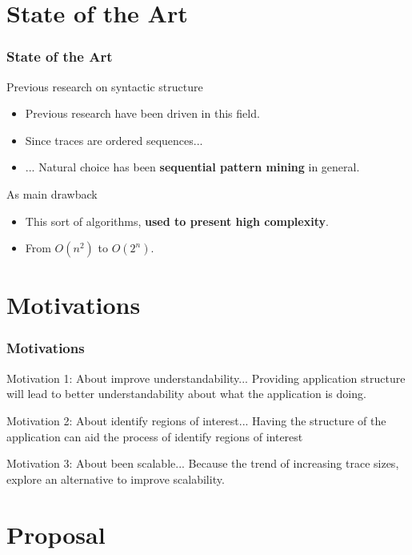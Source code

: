 \documentclass{beamer}
\begin{document}
\section{State of the Art}

\begin{frame}
\frametitle{State of the Art}
	Previous research on syntactic structure\\
	\begin{itemize}
		\item Previous research have been driven in this field.
		\item Since traces are ordered sequences...
		\item ... Natural choice has been \textbf{sequential pattern mining} in general.
	\end{itemize}
	As main drawback\\
	\begin{itemize}
		\item This sort of algorithms, \textbf{used to present high complexity}.
		\item From $O(n^{2})$ to $O(2^{n})$.
	\end{itemize}
\end{frame}

\section{Motivations}
\begin{frame}
\frametitle{Motivations}
\begin{block}{Motivation 1: About improve understandability...}
	Providing application structure will lead to better understandability about what the application is doing.
\end{block}
\pause
\begin{block}{Motivation 2: About identify regions of interest...}
	Having the structure of the application can aid the process of identify regions of interest
\end{block}
\pause
\begin{block}{Motivation 3: About been scalable...}
	Because the trend of increasing trace sizes, explore an alternative to improve scalability. 
\end{block}
\end{frame}

\section{Proposal}
\end{document}
